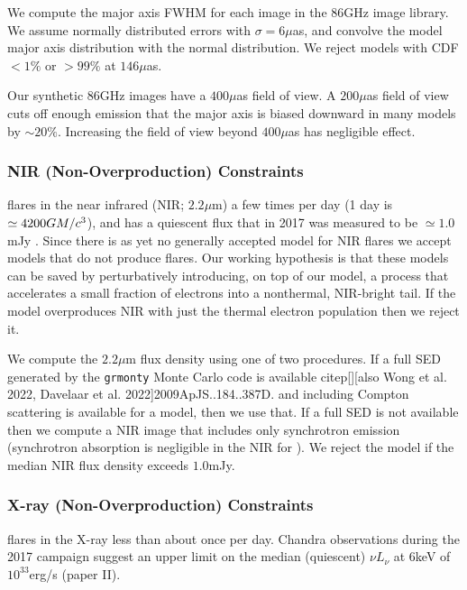 We compute the major axis FWHM for each image in the 86GHz image library.  We assume normally distributed errors with $\sigma = 6\mu$as, and convolve the model major axis distribution with the normal distribution.  We reject models with CDF $< 1\%$ or $> 99\%$ at $146\mu$as.

Our synthetic $86$GHz images have a $400\mu$as field of view.  A $200\mu$as field of view cuts off enough emission that the major axis is biased downward in many models by $\sim 20\%$.  Increasing the field of view beyond $400\mu$as has negligible effect.

\subsubsection{NIR (Non-Overproduction) Constraints}

\sgra flares in the near infrared (NIR; $2.2\mu$m) a few times per day (1 day is $\simeq 4200 GM/c^3$), and has a quiescent flux that in 2017 was measured to be $\simeq 1.0$mJy \citep{2020A&A...638A...2G}.  Since there is as yet no generally accepted model for NIR flares we accept models that do not produce flares.  Our working hypothesis is that these models can be saved by perturbatively introducing, on top of our model, a process that accelerates a small fraction of electrons into a nonthermal, NIR-bright tail.  If the model overproduces NIR with just the thermal electron population then we reject it.   

We compute the $2.2\mu$m flux density using one of two procedures.  If a full SED generated by the {\tt grmonty} Monte Carlo code is available citep[][also Wong et al. 2022, Davelaar et al. 2022]{2009ApJS..184..387D}. and including Compton scattering is available for a model, then we use that.  If a full SED is not available then we compute a NIR image that includes only synchrotron emission (synchrotron absorption is negligible in the NIR for \sgra).  We reject the model if the median NIR flux density exceeds $1.0$mJy.   

\subsubsection{X-ray (Non-Overproduction) Constraints}

\sgra flares in the X-ray less than about once per day.  Chandra observations during the 2017 campaign suggest an upper limit on the median (quiescent) $\nu L_\nu$ at $6$keV of $10^{33}$erg/s (paper II).

